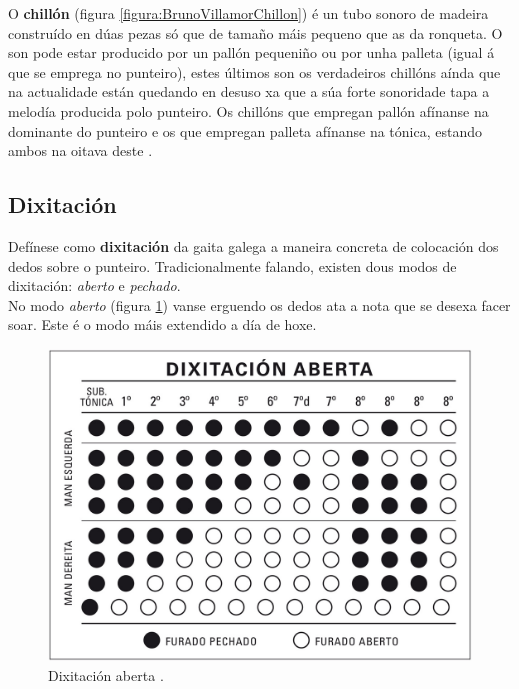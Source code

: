 O \textbf{chillón} (figura \ref{figura:BrunoVillamorChillon}) é un tubo sonoro
 de madeira construído en dúas pezas só que de tamaño máis pequeno que as da
 ronqueta. O son pode estar producido por un pallón pequeniño ou por unha
 palleta (igual á que se emprega no punteiro), estes últimos son os verdadeiros
 chillóns aínda que na actualidade están quedando en desuso xa que a súa forte
 sonoridade tapa a melodía producida polo punteiro. Os chillóns que empregan
 pallón afínanse na dominante do punteiro e os que empregan palleta afínanse na
 tónica, estando ambos na oitava deste \cite{BrunoVillamorCaderno15}.

 \subsection{Dixitación}

 Defínese como \textbf{dixitación} da gaita galega a maneira concreta de
 colocación dos dedos sobre o punteiro. Tradicionalmente falando, existen dous
 modos de dixitación: \textit{aberto} e \textit{pechado}. \\

 No modo \textit{aberto} (figura \ref{figura:PabloCarpinteroDixitacionAberta})
 vanse erguendo os dedos ata a nota que se desexa facer soar. Este é o modo
 máis extendido a día de hoxe. \\

 \begin{figure}[htbp]
  \centering
  \includegraphics[scale=0.2,keepaspectratio=true]{./imagenes/pablo-carpintero-dixitacion-aberta.jpg}
  \caption[Dixitación aberta]{Dixitación aberta \cite{PabloCarpintero}.}
  \label{figura:PabloCarpinteroDixitacionAberta}
 \end{figure}

